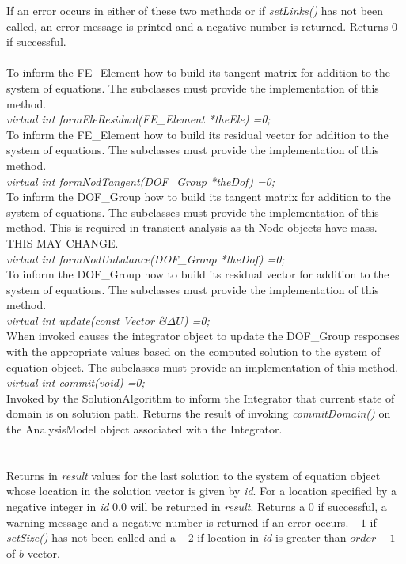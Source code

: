 \noindent If an error occurs in either of these two methods or if {\em
setLinks()} has not been called, an error message is printed and a
negative number is returned. Returns $0$ if successful. \\ 


 \\
To inform the FE\_Element how to build its tangent matrix for addition
to the system of equations. The subclasses must provide the
implementation of this method. \\

{\em virtual int formEleResidual(FE\_Element *theEle) =0;} \\
To inform the FE\_Element how to build its residual vector for addition
to the system of equations. The subclasses must provide the
implementation of this method. \\

{\em virtual int formNodTangent(DOF\_Group *theDof) =0;} \\
To inform the DOF\_Group how to build its tangent matrix for addition
to the system of equations. The subclasses must provide the
implementation of this method. This is required in transient analysis
as th Node objects have mass. THIS MAY CHANGE.\\

{\em virtual int formNodUnbalance(DOF\_Group *theDof) =0;} \\
To inform the DOF\_Group how to build its residual vector for addition
to the system of equations. The subclasses must provide the
implementation of this method. \\

{\em virtual int update(const Vector \&$\Delta U$) =0;} \\
When invoked causes the integrator object to update the DOF\_Group
responses with the appropriate values based on the computed solution
to the system of equation object. The subclasses must provide an
implementation of this method. \\

{\em virtual int commit(void) =0;} \\
Invoked by the SolutionAlgorithm to inform the Integrator that current
state of domain is on solution path. Returns the result of invoking
{\em commitDomain()} on the AnalysisModel object associated with the
Integrator. \\


\\
 \\
Returns in {\em result} values for the last solution to the system of
equation object whose location in the solution vector is given by {\em
id}. For a location specified by a negative integer in {\em id} 0.0 will be
returned in {\em result}. Returns a $0$ if successful, a warning
message and a negative number is returned if an error occurs. $-1$ if
{\em setSize()} has not been called and a $-2$ if location in {\em id} is
greater than $order-1$ of $b$ vector.\\

